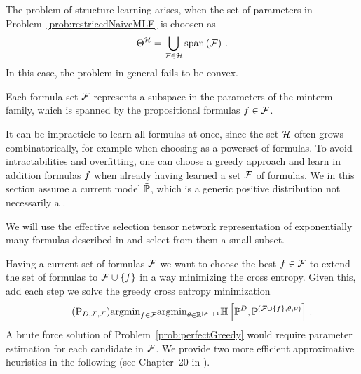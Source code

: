 
The problem of structure learning arises, when the set of parameters in Problem~\ref{prob:restricedNaiveMLE} is choosen as
\[ \Theta^{\mathcal{H}}= \bigcup_{\mathcal{F}\in\mathcal{H}} \mathrm{span}\left(\mathcal{F}\right) \, .  \] %
In this case, the problem in general fails to be convex.

Each formula set $\mathcal{F}$ represents a subspace in the parameters of the minterm family, which is spanned by the propositional formulas $f\in\mathcal{F}$.










It can be impracticle to learn all formulas at once, since the set $\mathcal{H}$ often grows combinatorically, for example when choosing as a powerset of formulas.
To avoid intractabilities and overfitting, one can choose a greedy approach and learn in addition formulas $f$ when already having learned a set $\mathcal{F}$ of formulas.
We in this section assume a current model $\tilde{\mathbb{P}}$, which is a generic positive distribution not necessarily a \MarkovLogicNetwork{}. %

% 
We will use the effective selection tensor network representation of exponentially many formulas described in  and select from them a small subset.




Having a current set of formulas $\mathcal{F}$ we want to choose the best $f\in\mathcal{F}$ to extend the set of formulas to $\mathcal{F}\cup\{f\}$ in a way minimizing the cross entropy.
Given this, add each step we solve the greedy cross entropy minimization
\begin{align}
    \label{prob:perfectGreedy}\tag{$\mathrm{P}_{\datamap,\formulaset,\fselectionmap}$}
    \argmin_{\formula\in\fselectionmap} \argmin_{\canparam\in\rr^{\cardof{\formulaset}+1}}
    \centropyof{\empdistribution}{\expdistof{(\formulaset\cup\{\formula\},\canparam,\basemeasure)}} \, .
\end{align}
A brute force solution of Problem~\eqref{prob:perfectGreedy} would require parameter estimation for each candidate in $\mathcal{F}$.
We provide two more efficient approximative heuristics in the following (see Chapter~20 in \cite{koller_probabilistic_2009}).


